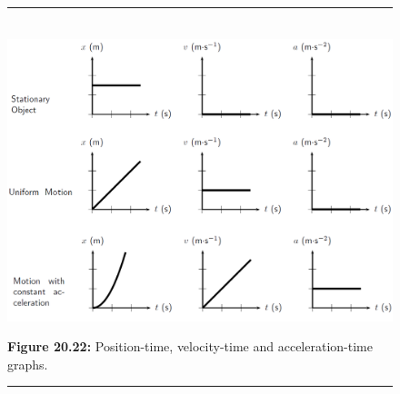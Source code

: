 	\begin{figure}[H] %
    \begin{center}
    \rule[.1in]{\figurerulewidth}{.005in} \\
        \label{m38795*id73150!!!underscore!!!media}\label{m38795*id73150!!!underscore!!!printimage}\includegraphics{col11305.imgs/m38795_PG10C2_029_1.png} %
        
      \vspace{2pt}
    \vspace{\rubberspace}\par \begin{cnxcaption}
	  \small \textbf{Figure 20.22: }Position-time, velocity-time and acceleration-time graphs.
	\end{cnxcaption}
      
    \vspace{.1in}
    \rule[.1in]{\figurerulewidth}{.005in} \\
        
    \end{center}

 \end{figure}   

    \addtocounter{footnote}{-0}
    
